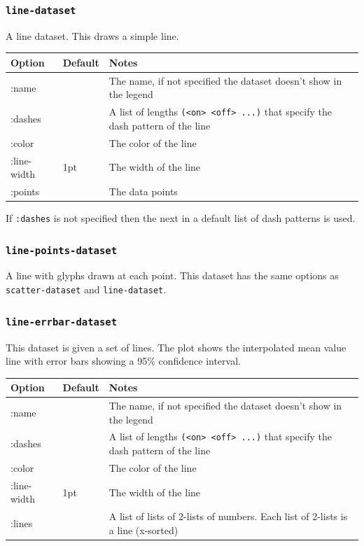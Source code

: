 \documentclass{article}
\begin{document}
\subsubsection{\tt line-dataset}

A line dataset.  This draws a simple line.

\begin{center}
\begin{tabular}{lll}
Option & Default & Notes \\
\hline
:name & & The name, if not specified the dataset doesn't show in
the legend\\
:dashes & & A list of lengths {\tt (<on> <off> ...)} that specify the
dash pattern of the line\\
:color & & The color of the line\\
:line-width & 1pt & The width of the line\\
:points & & The data points\\
\end{tabular}
\end{center}

If {\tt :dashes} is not specified then the next in a default list of
dash patterns is used.

\subsubsection{\tt line-points-dataset}

A line with glyphs drawn at each point.  This dataset has the same
options as {\tt scatter-dataset} and {\tt line-dataset}.

\subsubsection{\tt line-errbar-dataset}

This dataset is given a set of lines.  The plot shows the interpolated
mean value line with error bars showing a 95\% confidence interval.

\begin{center}
\begin{tabular}{lll}
Option & Default & Notes \\
\hline
:name & & The name, if not specified the dataset doesn't show in
the legend\\
:dashes & & A list of lengths {\tt (<on> <off> ...)} that specify the
dash pattern of the line\\
:color & & The color of the line\\
:line-width & 1pt & The width of the line\\
:lines & & A list of lists of 2-lists of numbers.  Each list of
2-lists is a line (x-sorted)\\
\end{tabular}
\end{center}
\end{document}
